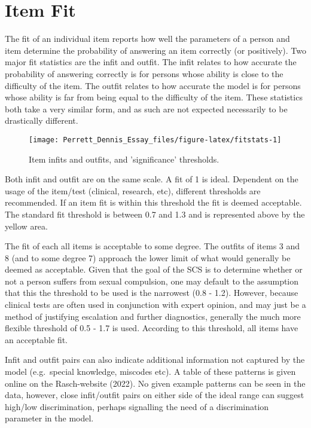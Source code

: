 \documentclass[
  man,floatsintext]{apa6}
\begin{document}
\hypertarget{item-fit}{%
\section{Item Fit}\label{item-fit}}

The fit of an individual item reports how well the parameters of a person and item determine the probability of answering an item correctly (or positively). Two major fit statistics are the infit and outfit. The infit relates to how accurate the probability of answering correctly is for persons whose ability is close to the difficulty of the item. The outfit relates to how accurate the model is for persons whose ability is far from being equal to the difficulty of the item. These statistics both take a very similar form, and as such are not expected necessarily to be drastically different.

\begin{figure}

{\centering \texttt{[image: Perrett\_Dennis\_Essay\_files/figure-latex/fitstats-1]} 

}

\caption{Item infits and outfits, and 'significance' thresholds.}\label{fig:fitstats}
\end{figure}

Both infit and outfit are on the same scale. A fit of 1 is ideal. Dependent on the usage of the item/test (clinical, research, etc), different thresholds are recommended. If an item fit is within this threshold the fit is deemed acceptable. The standard fit threshold is between 0.7 and 1.3 and is represented above by the yellow area.

The fit of each all items is acceptable to some degree. The outfits of items 3 and 8 (and to some degree 7) approach the lower limit of what would generally be deemed as acceptable. Given that the goal of the SCS is to determine whether or not a person suffers from sexual compulsion, one may default to the assumption that this the threshold to be used is the narrowest (0.8 - 1.2). However, because clinical tests are often used in conjunction with expert opinion, and may just be a method of justifying escalation and further diagnostics, generally the much more flexible threshold of 0.5 - 1.7 is used. According to this threshold, all items have an acceptable fit.

Infit and outfit pairs can also indicate additional information not captured by the model (e.g.~special knowledge, miscodes etc). A table of these patterns is given online on the Rasch-website (2022). No given example patterns can be seen in the data, however, close infit/outfit pairs on either side of the ideal range can suggest high/low discrimination, perhaps signalling the need of a discrimination parameter in the model.
\end{document}
